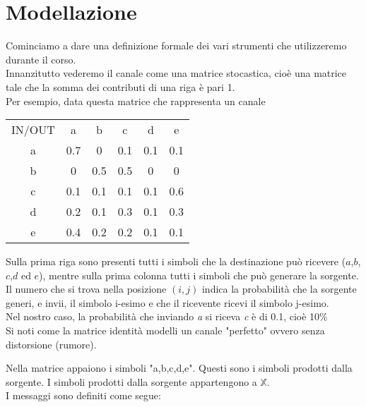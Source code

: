 \documentclass[12pt]{report}
\begin{document}
    \section{Modellazione}
    Cominciamo a dare una definizione formale dei vari strumenti che utilizzeremo durante il corso.\\
    Innanzitutto vederemo il canale come una matrice stocastica, cioè una matrice tale che la somma dei contributi di una riga è pari 1.\\
    Per esempio, data questa matrice che rappresenta un canale

    \begin{center}
        \begin{tabular}{ c c c c c c }
            IN/OUT &  a & b & c & d & e  \\
            a & 0.7 & 0 & 0.1 & 0.1 & 0.1  \\
            b & 0 & 0.5 & 0.5 & 0 & 0 \\
            c & 0.1 & 0.1 & 0.1 & 0.1 & 0.6 \\
            d & 0.2 & 0.1 & 0.3 & 0.1 & 0.3   \\
            e & 0.4 & 0.2 & 0.2 & 0.1 & 0.1 \\
        \end{tabular}
    \end{center}

    Sulla prima riga sono presenti tutti i simboli che la destinazione può ricevere ($a$,$b$,$c$,$d$ ed $e$), mentre sulla prima colonna tutti i simboli che può generare la sorgente. Il numero che si trova nella posizione $(i,j)$ indica la probabilità che  la sorgente generi, e invii, il simbolo i-esimo e che il ricevente ricevi il simbolo j-esimo. \\
    Nel nostro caso,  la probabilità che inviando \textit{a} si riceva \textit{c} è di 0.1, cioè 10\% \\
    Si noti come la matrice identità modelli un canale "perfetto" ovvero senza distorsione (rumore).
    \vspace{10px}

    \noindent Nella matrice appaiono i simboli "a,b,c,d,e". Questi sono i simboli prodotti dalla sorgente. I simboli prodotti dalla sorgente appartengono a $\mathbb{X}$.
    \\
    I messaggi sono definiti come segue:
    \vspace{5px}
\end{document}
